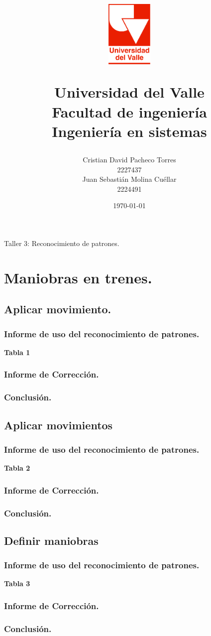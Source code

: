 \documentclass[12pt, a4paper]{article}
\title{
  \begin{figure}[th]
    \centering
    \includegraphics[width=0.2\textwidth]{Univalle}
  \end{figure}
  \textbf{Universidad del Valle
    \\{\Large Facultad de ingeniería}
  \\{\large Ingeniería en sistemas}}}
\author{Cristian David Pacheco Torres
  \\ 2227437
  \\ Juan Sebastián Molina Cuéllar
  \\ 2224491}
\date{\today}
\begin{document}
\maketitle
 { Taller 3: Reconocimiento de patrones.}
\newpage{}
\tableofcontents
\newpage{}
\section{Maniobras en trenes.}
\subsection{Aplicar movimiento.}
\subsubsection{Informe de uso del reconocimiento de patrones.}
\textbf{Tabla 1}
\subsubsection{Informe de Corrección.}
\subsubsection{Conclusión.}
\subsection{Aplicar movimientos}
\subsubsection{Informe de uso del reconocimiento de patrones.}
\textbf{Tabla 2}
\subsubsection{Informe de Corrección.}
\subsubsection{Conclusión.}
\subsection{Definir maniobras}
\subsubsection{Informe de uso del reconocimiento de patrones.}
\textbf{Tabla 3}
\subsubsection{Informe de Corrección.}
\subsubsection{Conclusión.}
\end{document}
